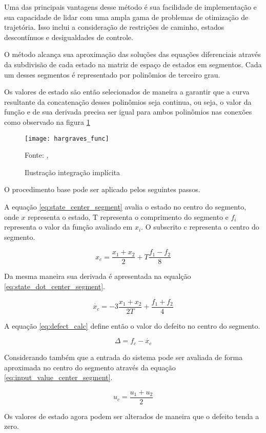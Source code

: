 Uma das principais vantagens desse método é sua facilidade de implementação e sua capacidade de lidar com uma ampla gama de problemas de otimização de trajetória. Isso inclui a consideração de restrições de caminho, estados descontínuos e desigualdades de controle.

O método alcança sua aproximação das soluções das equações diferenciais através da subdivisão de cada estado na matriz de espaço de estados em segmentos. Cada um desses segmentos é representado por polinômios de terceiro grau.

Os valores de estado são então selecionados de maneira a garantir que a curva resultante da concatenação desses polinômios seja continua, ou seja,
o valor da função e de sua derivada precisa ser igual para ambos polinômios nas conexões como observado na figura \ref{fig:hargraves_fun}

\begin{figure}[H]
    \centering
    \caption{Ilustração integração implícita}
    \texttt{[image: hargraves\_func]}

    {\footnotesize Fonte: \citeauthor{hargraves87}, \citeyear{hargraves87}}
    \label{fig:hargraves_fun}
\end{figure}

O procedimento base pode ser aplicado pelos seguintes passos.

A equação \ref{eq:state_center_segment} avalia o estado no centro do segmento, onde $x$ representa o estado, 
T representa o comprimento do segmento e $f_i$ representa o valor da função avaliado em $x_i$.
O subscrito c representa o centro do segmento.

\begin{equation}
    \label{eq:state_center_segment}
    x_c = \frac{x_{1} + x_{2}}{2} + T\frac{f_{1} - f_{2}}{8}
\end{equation}

Da mesma maneira sua derivada é apresentada na equalção \ref{eq:state_dot_center_segment}.

\begin{equation}
    \label{eq:state_dot_center_segment}
    \dot{x_{c}} = -3\frac{x_{1} + x_{2}}{2T} + \frac{f_{1} + f_{2}}{4}
\end{equation}

A equação \ref{eq:defect_calc} define então o valor do defeito no centro do segmento.

\begin{equation}
    \label{eq:defect_calc}
    \Delta = f_c - \dot{x_c}
\end{equation}

Considerando também que a entrada do sistema pode ser avaliada de forma aproximada no centro do segmento 
através da equação \ref{eq:input_value_center_segment}.

\begin{equation}
    \label{eq:input_value_center_segment}
    u_c = \frac{u_1 + u_2}{2}
\end{equation}

Os valores de estado agora podem ser alterados de maneira que o defeito tenda a zero.

